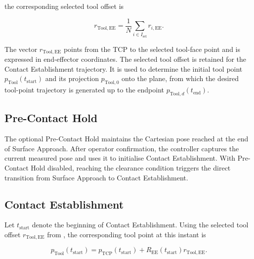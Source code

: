 the corresponding selected tool offset is

\begin{equation}
r_{\mathrm{Tool,EE}}
=
\frac{1}{N}\sum_{i\in I_{\mathrm{sel}}}r_{i,\mathrm{EE}}.
\label{eq:implementation_leading_feature_average}
\end{equation}

The vector \mbox{\(r_{\mathrm{Tool,EE}}\)} points from the TCP to the
selected tool-face point and is expressed in end-effector coordinates. The
selected tool offset is retained for the Contact Establishment trajectory. It
is used to determine the initial tool point
\mbox{\(p_{\mathrm{Tool}}(t_{\mathrm{start}})\)} and its projection
\mbox{\(p_{\mathrm{Tool},0}\)} onto the plane, from which the desired
tool-point trajectory is generated up to the endpoint
\mbox{\(p_{\mathrm{Tool},d}(t_{\mathrm{end}})\)}.


\subsection{Pre-Contact Hold}
\label{subsec:implementation_pre_contact_hold}

The optional Pre-Contact Hold maintains the Cartesian pose reached at the end
of Surface Approach. After operator confirmation, the controller captures the
current measured pose and uses it to initialise Contact Establishment. With
Pre-Contact Hold disabled, reaching the clearance condition triggers the direct
transition from Surface Approach to Contact Establishment.

\subsection{Contact Establishment}
\label{subsec:implementation_setup_phase}
\label{sec:surface_frame_gains}
\label{subsec:phase_dependent_gain_construction}
\label{sec:self_alignment_virtual_center}

Let \mbox{\(t_{\mathrm{start}}\)} denote the beginning of Contact
Establishment. Using the selected tool offset
\mbox{\(r_{\mathrm{Tool,EE}}\)} from
\mbox{}, the corresponding
tool point at this instant is

\begin{equation}
p_{\mathrm{Tool}}(t_{\mathrm{start}})
=
p_{\mathrm{TCP}}(t_{\mathrm{start}})
+R_{\mathrm{EE}}(t_{\mathrm{start}})r_{\mathrm{Tool,EE}}.
\label{eq:implementation_clearance_tool_point}
\end{equation}

